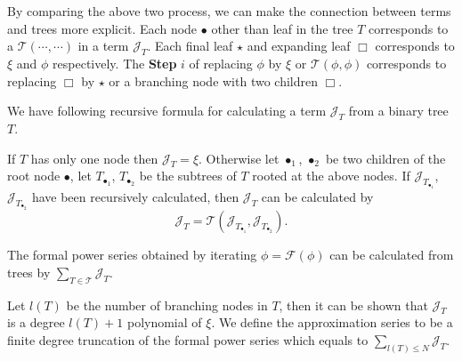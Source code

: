 \begin{itemize}
    
\end{itemize}


By comparing the above two process, we can make the connection between terms and trees more explicit. Each node $\bullet$ other than leaf in the tree $T$ corresponds to a $\mathcal{T}(\cdots,\cdots)$ in a term $\mathcal{J}_{T}$. Each final leaf $\star$ and expanding leaf $\Box$ corresponds to $\xi$ and $\phi$ respectively. The \textbf{Step} $i$ of replacing $\phi$ by $\xi$ or $\mathcal{T}(\phi,\phi)$ corresponds to replacing $\Box$ by $\star$ or a branching node with two children $\Box$.

We have following recursive formula for calculating a term $\mathcal{J}_T$ from a binary tree $T$. 

If $T$ has only one node then $\mathcal{J}_T=\xi$. Otherwise let $\bullet_1$, $\bullet_2$ be two children of the root node $\bullet$, let $T_{\bullet_1}$, $T_{\bullet_2}$ be the subtrees of $T$ rooted at the above nodes. If $\mathcal{J}_{T_{\bullet_1}}$, $\mathcal{J}_{T_{\bullet_2}}$ have been recursively calculated, then $\mathcal{J}_T$ can be calculated by
\begin{equation}\label{eq.treeterm'}
    \mathcal{J}_T=\mathcal{T}(\mathcal{J}_{T_{\bullet_1}}, \mathcal{J}_{T_{\bullet_2}}).
\end{equation}

The formal power series obtained by iterating $\phi=\mathcal{F}(\phi)$ can be calculated from trees by $\sum_{T\in \mathscr{T}} \mathcal{J}_T$.

Let $l(T)$ be the number of branching nodes in $T$, then it can be shown that $\mathcal{J}_T$ is a degree $l(T)+1$ polynomial of $\xi$. We define the approximation series to be a finite degree truncation of the formal power series which equals to $\sum_{l(T)\le N} \mathcal{J}_T$.


